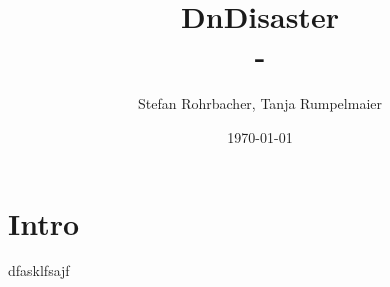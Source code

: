 \documentclass[11pt, a4paper, twoside]{book}
\author{Stefan Rohrbacher, Tanja Rumpelmaier}
\date{\today}
\title{DnDisaster\\\medskip
\large -}
\begin{document}
\maketitle
\tableofcontents

\part{Intro\label{intro}}
\label{sec:orgcc19d8d}


dfasklfsajf\pageref{intro}
\end{document}
